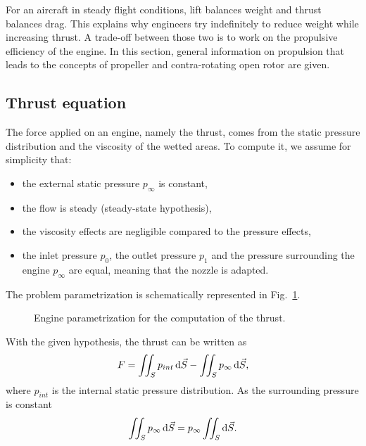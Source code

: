
For an aircraft in steady flight conditions, 
lift balances weight and 
thrust balances drag. This explains why engineers try
indefinitely to reduce weight while increasing
thrust. A trade-off between those two is to work
on the propulsive efficiency of the engine. In this
section, general information on propulsion
that leads to the concepts of propeller and
contra-rotating open rotor are given.

\subsection{Thrust equation}
\label{sub:cror_thrust}

The force applied on an engine, namely the thrust,
comes from the static pressure
distribution and the viscosity of the wetted areas.
To compute it, we assume for simplicity that:
 \begin{itemize} \itemsep0pt \parskip0pt
  \item the external static pressure $p_\infty$ is
  constant,
  \item the flow is steady (steady-state hypothesis),
  \item the viscosity effects are negligible compared
  to the pressure effects,
  \item the inlet pressure $p_0$, the outlet pressure
  $p_1$ and the pressure surrounding the engine $p_\infty$ are equal,
  meaning that the nozzle is adapted.
\end{itemize}
The problem parametrization is schematically represented
in Fig.~\ref{fig:engine_parametrization}.
\begin{figure}[htp]
  \centering
  \quad{}
  \caption{Engine parametrization for the computation of the thrust.}
  \label{fig:engine_parametrization}
\end{figure}
With the given hypothesis, the thrust can be written as
\begin{equation}
	F = \iint_{S} p_{int} \diff \vec{S} - 
	    \iint_{S} p_{\infty} \diff \vec{S},
	\label{eq:thrust_1}
\end{equation}
where $p_{int}$ is the internal static
pressure distribution.
As the surrounding pressure is constant
\begin{equation}
	\iint_{S} p_{\infty} \mathop{}\!\mathrm{d} \vec{S} = 
	p_{\infty} \iint_{S} \mathop{}\!\mathrm{d} \vec{S}.
\end{equation}
